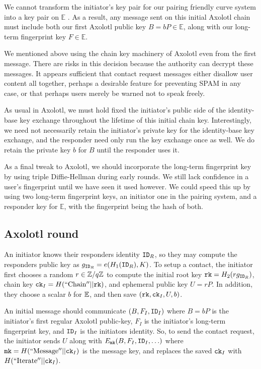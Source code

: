 \documentclass[twoside,letterpaper]{sig-alternate}
\begin{document}
We cannot transform the initiator's key pair for
 our pairing friendly curve system
into a key pair on $\mathbb{E}$ \cite{??no_homomorphism??}.
As a result, any message sent on this initial Axolotl chain must include
both our first Axolotl public key $B = b P \in \mathbb{E}$, along with
 our long-term fingerprint key $F \in \mathbb{E}$.

We mentioned above using the chain key machinery of Axolotl even from
the first message.  There are risks in this decision because the
authority can decrypt these messages.  It appears sufficient that
contact request messages either disallow user content all together,
perhaps a desirable feature for preventing SPAM in any case, or that 
perhaps users merely be warned not to speak freely.

As usual in Axolotl, we must hold fixed the initiator's public side of
the identity-base key exchange throughout the lifetime of this initial
chain key.  Interestingly, we need not necessarily retain the 
initiator's private key for the identity-base key exchange, and
 the responder need only run the key exchange once as well.
We do retain the private key $b$ for $B$ until the responder uses it.

As a final tweak to Axolotl, we should incorporate the long-term
fingerprint key by using triple Diffie-Hellman during early rounds.
We still lack confidence in a user's fingerprint until
we have seen it used however.
We could speed this up by using two long-term fingerprint keys,
an initiator one in the pairing system, and
 a responder key for $\mathbb{E}$,
with the fingerprint being the hash of both.

\subsection{Axolotl round} %

An initiator knows their responders identity $\mathtt{ID}_R$, so they may
compute the responders public key as $g_{\mathtt{ID}_R} = e(H_1(\mathtt{ID}_R),K)$.
To setup a contact, the initiator first chooses a random $r \in \mathbb{Z}/q\mathbb{Z}$
to compute the initial root key $\mathtt{rk} = H_2( r g_{\mathtt{ID}_R} )$,
chain key $\mathtt{ck}_I = H(\mathrm{``Chain''} || \mathtt{rk})$, and
ephemeral public key $U = r P$.
In addition, they choose a scalar $b$ for $\mathbb{E}$,
 and then save $(\mathtt{rk},\mathtt{ck}_I,U,b)$.

An initial message should communicate $(B,F_I,\mathtt{ID}_I)$ where 
 $B = b P$ is the initiator's first regular Axolotl public-key,
 $F_I$ is the initiator's long-term fingerprint key, and
 $\mathtt{ID}_I$ is the initiators identity.
So, to send the contact request, the initiator
sends $U$ along with $E_{\mathtt{mk}}(B,F_I,\mathtt{ID}_I,\ldots)$ where 
 $\mathtt{mk} = H(\mathrm{``Message''}  || \mathtt{ck}_I)$ is the message key,
and replaces the saved $\mathtt{ck}_I$ with $H(\mathrm{``Iterate''} || \mathtt{ck}_I)$.
\end{document}
